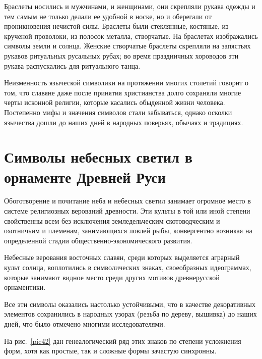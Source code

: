 \documentclass[pscyr,titlepage,chapters]{hedreport}
\begin{document}
  Браслеты носились и мужчинами, и женщинами, они скрепляли рукава одежды и тем
  самым не только делали ее удобной в носке, но и оберегали от проникновения
  нечистой силы. Браслеты были стеклянные, костяные, из крученой проволоки, из
  полосок металла, створчатые. На браслетах изображались символы земли и солнца.
  Женские створчатые браслеты скрепляли на запястьях рукавов ритуальных
  русальных рубах; во время праздничных хороводов эти рукава распускались для
  ритуального танца.

  Неизменность языческой символики на протяжении многих столетий говорит о том,
  что славяне даже после принятия христианства долго сохраняли многие черты
  исконной религии, которые касались обыденной жизни человека. Постепенно мифы и
  значения символов стали забываться, однако осколки язычества дошли до наших
  дней в народных поверьях, обычаях и традициях.

  \chapter{Символы небесных светил в орнаменте Древней Руси}
 
  Обоготворение и почитание неба и небесных светил занимает огромное место в
  системе религиозных верований древности. Эти культы в той или иной степени
  свойственны всем без исключения земледельческим скотоводческим и охотничьим и
  племенам, занимающихся ловлей рыбы, конвергентно возникая на определенной
  стадии общественно-экономического развития.

  Небесные верования восточных славян, среди которых выделяется аграрный культ
  солнца, воплотились в символических знаках, своеобразных идеограммах, которые
  занимают видное место среди других мотивов древнерусской орнаментики.

  Все эти символы оказались настолько устойчивыми, что в качестве декоративных
  элементов сохранились в народных узорах (резьба по дереву, вышивка) до наших
  дней, что было отмечено многими исследователями.

  На рис.~\ref{pic42} дан генеалогический ряд этих знаков по степени усложнения
  форм, хотя как простые, так и сложные формы зачастую синхронны.
 
\end{document}
